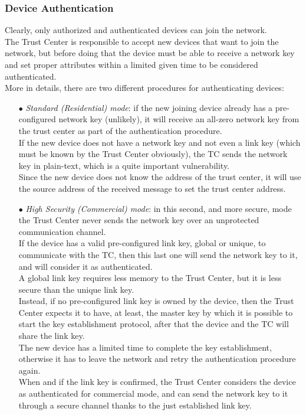 \documentclass[12pt]{report}
\begin{document}
{\subsubsection{Device Authentication}
\bigskip
Clearly, only authorized and authenticated devices can join the network.\\
The Trust Center is responsible to accept new devices that want to join the network, but before doing that the device must be able to receive a network key and set proper attributes within a limited given time to be considered authenticated.\\
More in details, there are two different procedures for authenticating devices:

\begin{itemize}
\setlength{\itemindent}{+4mm}
\item[$\bullet$] \emph{Standard (Residential) mode}: if the new joining device already has a pre-configured network key (unlikely), it will receive an all-zero network key from the trust center as part of the authentication procedure.\\
If the new device does not have a network key and not even a link key (which must be known by the Trust Center obviously), the TC  sends the network key in plain-text, which is a quite important vulnerability.\\
Since the new device does not know the address of the trust center, it will use the source address of the received message to set the trust center address.

\item[$\bullet$] \emph{High Security (Commercial) mode}: in this second, and more secure, mode the Trust Center never sends the network key over an unprotected communication channel.\\
If the device has a valid pre-configured link key, global or unique, to communicate with the TC, then this last one will send the network key to it, and will consider it as authenticated.\\
A global link key requires less memory to the Trust Center, but it is less secure than the unique link key.\\
Instead, if no pre-configured link key is owned by the device, then the Trust Center expects it to have, at least, the master key by which it is possible to start the key establishment protocol, after that the device and the TC will share the link key.\\
The new device has a limited time to complete the key establishment, otherwise it has to leave the network and retry the authentication procedure again.\\
When and if the link key is confirmed, the Trust Center considers the device as authenticated for commercial mode, and can send the network key to it through a secure channel thanks to the just established link key.\\


\end{itemize}}
\end{document}

